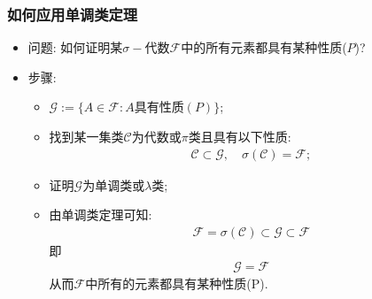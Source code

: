   \begin{frame}
	\frametitle{如何应用单调类定理}
	\begin{itemize}[<+-|alert@+>]
	\item 问题: 如何证明某$\sigma-$代数$\mathcal{F}$中的所有元素都具有某种性质($P$)?
	\item 步骤:
	  \begin{itemize}[<+-|alert@+>]
	  \item $\mathcal{G}:=\{A\in \mathcal{F}: A\mbox{具有性质}(P)\}$;
	  \item 找到某一集类$\mathcal{C}$为代数或$\pi$类且具有以下性质:
		\begin{eqnarray*}
		  \mathcal{C}\subset \mathcal{G}, \quad  \sigma(\mathcal{C})=\mathcal{F};
		\end{eqnarray*}
	  \item 证明$\mathcal{G}$为单调类或$\lambda$类;
	  \item 由单调类定理可知:
		\begin{eqnarray*}
		  \mathcal{F}=\sigma(\mathcal{C})\subset \mathcal{G}\subset \mathcal{F}
		\end{eqnarray*}
   即
   \begin{eqnarray*}
	 \mathcal{G}=\mathcal{F}
   \end{eqnarray*}
  从而$\mathcal{F}$中所有的元素都具有某种性质(P).
	  \end{itemize}

	\end{itemize}
  \end{frame}




